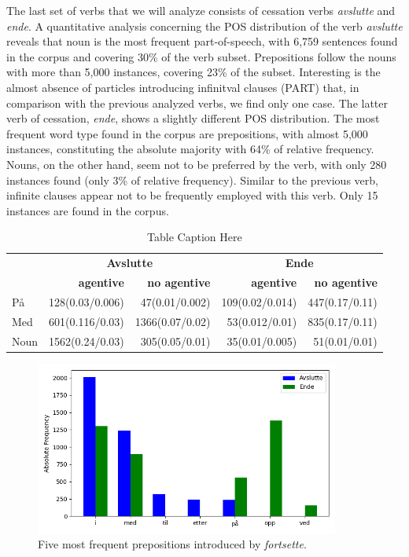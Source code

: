 \documentclass{article}
\begin{document}
\noindent The last set of verbs that we will analyze consists of cessation verbs \emph{avslutte} and \emph{ende}. A quantitative analysis concerning the POS distribution of the verb \emph{avslutte} reveals that noun is the most frequent part-of-speech, with 6,759 sentences found in the corpus and covering 30\% of the verb subset. Prepositions follow the nouns with more than 5,000 instances, covering 23\% of the subset. Interesting is the almost absence of particles introducing infinitval clauses (PART) that, in comparison with the previous analyzed verbs, we find only one case. The latter verb of cessation, \emph{ende}, shows a slightly different POS distribution. The most frequent word type found in the corpus are prepositions, with almost 5,000 instances, constituting the absolute majority with 64\% of relative frequency. Nouns, on the other hand, seem not to be preferred by the verb, with only 280 instances found (only 3\% of relative frequency). Similar to the previous verb, infinite clauses appear not to be frequently employed with this verb. Only 15 instances are found in the corpus. 
\begin{table}[h]
    \centering
    \begin{tabular}{lrrrr}
        \toprule
        & \multicolumn{2}{c}{\textbf{Avslutte}} & \multicolumn{2}{c}{\textbf{Ende}} \\
        \cmidrule(lr){2-3} \cmidrule(lr){4-5}
        \textbf{} & \textbf{agentive} & \textbf{no agentive} & \textbf{agentive} & \textbf{no agentive} \\
        \midrule
        På &   128(0.03/0.006) & 47(0.01/0.002) & 109(0.02/0.014) & 447(0.17/0.11)\\
        Med      &  601(0.116/0.03) & 1366(0.07/0.02)  & 53(0.012/0.01) &  835(0.17/0.11)\\
        Noun      &  1562(0.24/0.03) & 305(0.05/0.01) & 35(0.01/0.005) &  51(0.01/0.01) \\
        \bottomrule
    \end{tabular}
    \caption{Table Caption Here}
    \label{tab:cessation_verbs_agentive}
\end{table}
\begin{figure}[htp]
    \centering
    \includegraphics[width=10cm]{pics/barplot_adp_avslutte_ende.png}
    \caption{Five most frequent prepositions introduced by \emph{fortsette}.}
    \label{fig:barplot_pos_fortsette}
\end{figure}
\end{document}
